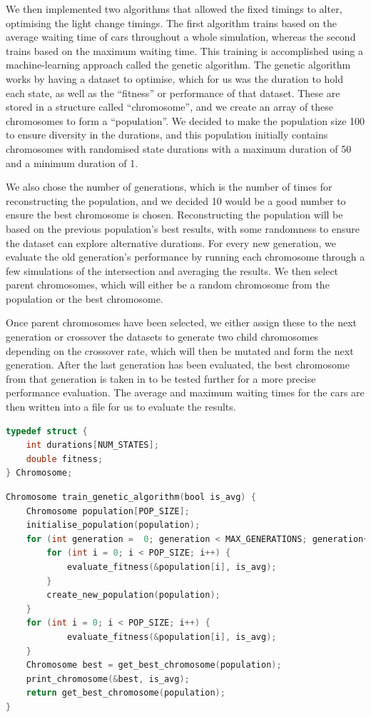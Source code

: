 \documentclass{article}
\begin{document}
We then implemented two algorithms that allowed the fixed timings to alter, optimising the light change timings. The first algorithm trains based on the average waiting time of cars throughout a whole simulation, whereas the second trains based on the maximum waiting time. This training is accomplished using a machine-learning approach called the genetic algorithm. The genetic algorithm works by having a dataset to optimise, which for us was the duration to hold each state, as well as the “fitness” or performance of that dataset. These are stored in a structure called “chromosome”, and we create an array of these chromosomes to form a “population”. We decided to make the population size 100 to ensure diversity in the durations, and this population initially contains chromosomes with randomised state durations with a maximum duration of 50 and a minimum duration of 1.

We also chose the number of generations, which is the number of times for reconstructing the population, and we decided 10 would be a good number to ensure the best chromosome is chosen. Reconstructing the population will be based on the previous population's best results, with some randomness to ensure the dataset can explore alternative durations. For every new generation, we evaluate the old generation’s performance by running each chromosome through a few simulations of the intersection and averaging the results. We then select parent chromosomes, which will either be a random chromosome from the population or the best chromosome.

Once parent chromosomes have been selected, we either assign these to the next generation or crossover the datasets to generate two child chromosomes depending on the crossover rate, which will then be mutated and form the next generation. After the last generation has been evaluated, the best chromosome from that generation is taken in to be tested further for a more precise performance evaluation. The average and maximum waiting times for the cars are then written into a file for us to evaluate the results.
\begin{lstlisting}[language=C, caption=The structure of the Chromosome]
typedef struct {
    int durations[NUM_STATES];
    double fitness;
} Chromosome;
\end{lstlisting}
\begin{lstlisting}[language=C, caption=The main training loop]
Chromosome train_genetic_algorithm(bool is_avg) {
    Chromosome population[POP_SIZE];
    initialise_population(population);
    for (int generation =  0; generation < MAX_GENERATIONS; generation++) {
        for (int i = 0; i < POP_SIZE; i++) {
            evaluate_fitness(&population[i], is_avg);
        }
        create_new_population(population);
    }
    for (int i = 0; i < POP_SIZE; i++) {
            evaluate_fitness(&population[i], is_avg);
    }
    Chromosome best = get_best_chromosome(population);
    print_chromosome(&best, is_avg);
    return get_best_chromosome(population);
}
\end{lstlisting}
\end{document}
